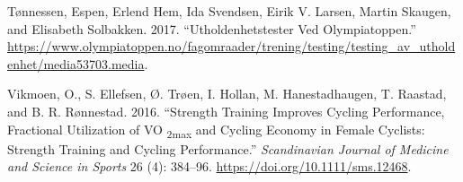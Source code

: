 \documentclass[
]{book}
\newlength{\cslhangindent}
\newlength{\cslentryspacingunit} %
\newenvironment{CSLReferences}[2] %
 {%
  \setlength{\parindent}{0pt}
  \ifodd #1
  \let\oldpar\par
  \def\par{\hangindent=\cslhangindent\oldpar}
  \fi
  \setlength{\parskip}{#2\cslentryspacingunit}
 }%
 {}
\begin{document}
\begin{CSLReferences}{1}{0}
\leavevmode{}%
Tønnessen, Espen, Erlend Hem, Ida Svendsen, Eirik V. Larsen, Martin
Skaugen, and Elisabeth Solbakken. 2017. {``Utholdenhetstester Ved
Olympiatoppen.''}
\url{https://www.olympiatoppen.no/fagomraader/trening/testing/testing_av_utholdenhet/media53703.media}.

\leavevmode{}%
Vikmoen, O., S. Ellefsen, Ø. Trøen, I. Hollan, M. Hanestadhaugen, T.
Raastad, and B. R. Rønnestad. 2016. {``Strength Training Improves
Cycling Performance, Fractional Utilization of VO {\textsubscript{2max}}
and Cycling Economy in Female Cyclists: Strength Training and Cycling
Performance.''} \emph{Scandinavian Journal of Medicine and Science in
Sports} 26 (4): 384--96. \url{https://doi.org/10.1111/sms.12468}.

\end{CSLReferences}

\backmatter
\end{document}
